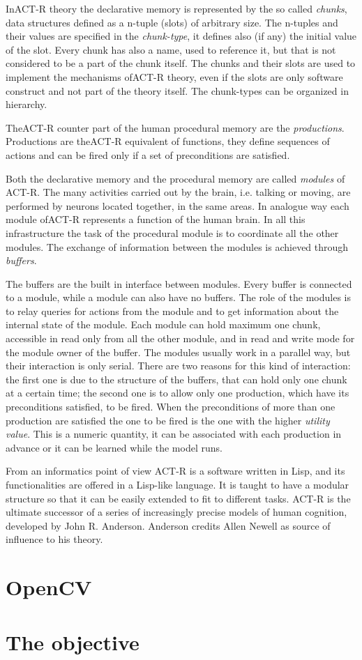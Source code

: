 In\mbox{ACT-R} theory the declarative memory is represented by the so called \emph{chunks}, data structures defined as a n-tuple (slots) of arbitrary size. The n-tuples and their values are specified in the \emph{chunk-type}, it defines also (if any) the initial value of the slot. Every chunk has also a name, used to reference it, but that is not considered to be a part of the chunk itself. The chunks and their slots are used to implement the mechanisms of\mbox{ACT-R} theory, even if the slots are only software construct and not part of the theory itself. The chunk-types can be organized in hierarchy.

The\mbox{ACT-R} counter part of the human procedural memory are the \emph{productions}. Productions are the\mbox{ACT-R} equivalent of functions, they define sequences of actions and can be fired only if a set of preconditions are satisfied. 

Both the declarative memory and the procedural memory are called \emph{modules} of \mbox{ACT-R}.  The many activities carried out by the brain, i.e. talking or moving, are performed by neurons located together, in the same areas. In analogue way each module of\mbox{ACT-R} represents a function of the human brain. In all this infrastructure the task of the procedural module is to coordinate all the other modules. The exchange of information between the modules is achieved through \emph{buffers}.

The buffers are the built in interface between modules. Every buffer is connected to a module, while a module can also have no buffers. The role of the modules is to relay queries for actions from the module and to get information about the internal state of the module. Each module can hold maximum one chunk, accessible in read only from all the other module, and in read and write mode for the module owner of the buffer. The modules usually work in a parallel way, but their interaction is only serial. There are two reasons for this kind of interaction: the first one is due to the structure of the buffers, that can hold only one chunk at a certain time; the second one is to allow only one production, which have its preconditions satisfied, to be fired. When the preconditions of more than one production are satisfied the one to be fired is the one with the higher \emph{utility value}. This is a numeric quantity, it can be associated with each production in advance or it can be learned while the model runs.

From an informatics point of view ACT-R is a software written in Lisp, and its functionalities are offered in a Lisp-like language. It is taught to have a modular structure so that it can be easily extended to fit to different tasks. ACT-R is the ultimate successor of a series of increasingly precise models of human cognition, developed by John R. Anderson. Anderson credits Allen Newell as source of influence to his theory.
\section{OpenCV}
\section{The objective}








